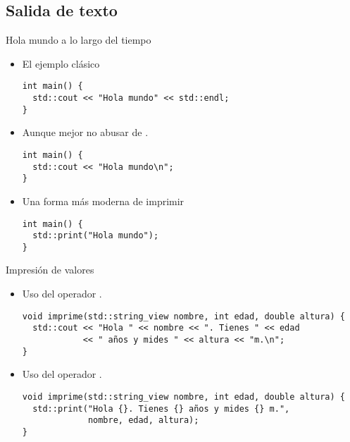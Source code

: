 \subsection{Salida de texto}

\begin{frame}[t,fragile]{Hola mundo a lo largo del tiempo}
\begin{itemize}
  \item El ejemplo clásico
\begin{lstlisting}
int main() {
  std::cout << "Hola mundo" << std::endl;
}
\end{lstlisting}

  \pause
  \item Aunque mejor no abusar de .
\begin{lstlisting}
int main() {
  std::cout << "Hola mundo\n";
}
\end{lstlisting}

  \pause
  \item Una forma más moderna de imprimir
\begin{lstlisting}
int main() {
  std::print("Hola mundo");
}
\end{lstlisting}
\end{itemize}
\end{frame}

\begin{frame}[t,fragile]{Impresión de valores}
\begin{itemize}
\item Uso del operador \cppkey{<{}<}.
\begin{lstlisting}
void imprime(std::string_view nombre, int edad, double altura) {
  std::cout << "Hola " << nombre << ". Tienes " << edad 
            << " años y mides " << altura << "m.\n";
}
\end{lstlisting}

\pause
\item Uso del operador \cppkey{<{}<}.
\begin{lstlisting}
void imprime(std::string_view nombre, int edad, double altura) {
  std::print("Hola {}. Tienes {} años y mides {} m.",
             nombre, edad, altura);
}
\end{lstlisting}

\end{itemize}
\end{frame}
